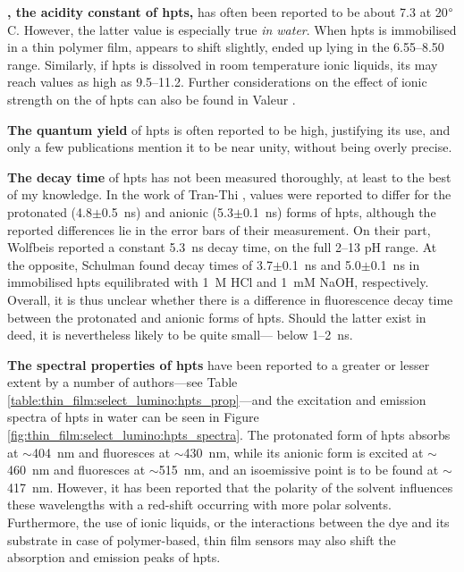 \textbf{\pKa, the acidity constant of \gls{hpts},} has often been reported to be about 7.3 at 20$\degree$C. However, the latter value is especially true \emph{in water}. When \gls{hpts} is immobilised in a thin polymer film, \pKa{} appears to shift slightly, ended up lying in the 6.55--8.50 range\cite{schulman1995, hakonen2008}. Similarly, if \gls{hpts} is dissolved in room temperature ionic liquids, its \pKa{} may reach values as high as 9.5--11.2\cite{oter2006}. Further considerations on the effect of ionic strength on the \pKa{} of \gls{hpts} can also be found in Valeur \etal{}\cite[p.~414]{valeur2012molecfluo}.

\textbf{The quantum yield} of \gls{hpts} is often reported to be high, justifying its use, and only a few publications mention it to be near unity, without being overly precise\cite{schulman1995, tranthi2002, kumar2018}.

\textbf{The decay time} of \gls{hpts} has not been measured thoroughly, at least to the best of my knowledge. In the work of Tran-Thi \etal{}\cite{tranthi2002}, values were reported to differ for the protonated (4.8$\pm$0.5~ns) and anionic (5.3$\pm$0.1~ns) forms of \gls{hpts}, although the reported differences lie in the error bars of their measurement. On their part, Wolfbeis \etal{}\cite{wolfbeis1983} reported a constant 5.3~ns decay time, on the full 2--13 pH range. At the opposite, Schulman \etal{}\cite{schulman1995} found decay times of 3.7$\pm$0.1~ns and 5.0$\pm$0.1~ns in immobilised \gls{hpts} equilibrated with 1~M HCl and 1~mM NaOH, respectively. Overall, it is thus unclear whether there is a difference in fluorescence decay time between the protonated and anionic forms of \gls{hpts}. Should the latter exist in deed, it is nevertheless likely to be quite small---\ie{} below 1--2~ns. %

\textbf{The spectral properties of \gls{hpts}} have been reported to a greater or lesser extent by a number of authors---see Table \ref{table:thin_film:select_lumino:hpts_prop}---and the excitation and emission spectra of \gls{hpts} in water can be seen in Figure \ref{fig:thin_film:select_lumino:hpts_spectra}. The protonated form of \gls{hpts} absorbs at $\sim$404~nm and fluoresces at $\sim$430~nm, while its anionic form is excited at $\sim$460~nm and fluoresces at $\sim$515~nm, and an isoemissive point is to be found at $\sim$417~nm\cite{uttamlal1995, oter2008}. However, it has been reported that the polarity of the solvent influences these wavelengths with a red-shift occurring with more polar solvents\cite{barrash1998, tranthi2002}. Furthermore, the use of ionic liquids\cite{oter2006, oter2008}, or the interactions between the dye and its substrate in case of polymer-based, thin film sensors\cite{malins1998, chu2008, chu2009} may also shift the absorption and emission peaks of \gls{hpts}.

